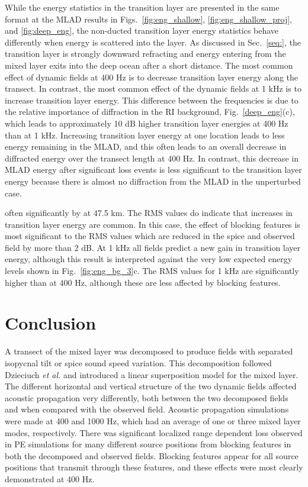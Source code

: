 \documentclass[preprint,NumberedRefs]{JASA}
\begin{document}
While the energy statistics in the transition layer are presented in the same format at the MLAD results in Figs.~\ref{fig:eng_shallow}, \ref{fig:eng_shallow_proj}, and \ref{fig:deep_eng}, the non-ducted transition layer energy statistics behave differently when energy is scattered into the layer. As discussed in Sec.~\ref{seq:}, the transition layer is strongly downward refracting and energy entering from the mixed layer exits into the deep ocean after a short distance. The most common effect of dynamic fields at 400 Hz is to decrease transition layer energy along the transect. In contrast, the most common effect of the dynamic fields at 1 kHz is to increase transition layer energy. This difference between the frequencies is due to the relative importance of diffraction in the RI background, Fig.~\ref{deep_eng}(c), which leads to approximately 10 dB higher transition layer energies at 400 Hz than at 1 kHz. Increasing transition layer energy at one location leads to less energy remaining in the MLAD, and this often leads to an overall decrease in diffracted energy over the transect length at 400 Hz. In contrast, this decrease in MLAD energy after significant loss events is less significant to the transition layer energy because there is almost no diffraction from the MLAD in the unperturbed case.

often significantly by at 47.5 km. The RMS values do indicate that increases in transition layer energy are common. In this case, the effect of blocking features is most significant to the RMS values which are reduced in the spice and observed field by more than 2 dB. At 1 kHz all fields predict a new gain in transition layer energy, although this result is interpreted against the very low expected energy levels shown in Fig.~\ref{fig:eng_bg_3}{c}. The RMS values for 1 kHz are significantly higher than at 400 Hz, although these are less affected by blocking features.

\section{Conclusion}\label{sec:conclusion}
A transect of the mixed layer was decomposed to produce fields with separated isopycnal tilt or spice sound speed variation. This decomposition followed Dzieciuch \emph{et al.}\citep{dzieciuch2004} and introduced a linear superposition model for the mixed layer. The different horizontal and vertical structure of the two dynamic fields affected acoustic propagation very differently, both between the two decomposed fields and when compared with the observed field. Acoustic propagation simulations were made at 400 and 1000 Hz, which had an average of one or three mixed layer modes, respectively. There was significant localized range dependent loss observed in PE simulations for many different source positions from blocking features in both the decomposed and observed fields. Blocking features appear for all source positions that transmit through these features, and these effects were most clearly demonstrated at 400 Hz.
\end{document}
